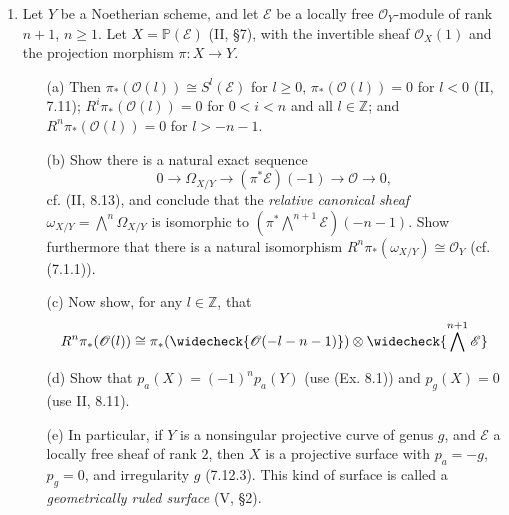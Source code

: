 \documentclass{article}
\newcommand{\fE}{\mathscr{E}}
\newcommand{\fO}{\mathscr{O}}
\newcommand{\PP}{\mathbb{P}}
\newcommand{\Z}{\mathbb{Z}}
\begin{document}
\begin{enumerate} [label=\textbf{\arabic*.}, leftmargin=0em]
\item Let $Y$ be a Noetherian scheme, and let $\mathscr{E}$ be a locally free $\fO_Y$-module of rank $n + 1$, $n \geq 1$. Let $X = \PP(\mathscr{E})$ (II, \S 7), with the invertible sheaf $\fO_X(1)$ and the projection morphism $\pi : X \to Y$.
\begin{itemize}
  \item[(a)] Then $\pi_*(\fO(l)) \cong S^l(\fE)$ for $l \geq 0$, $\pi_*(\fO(l)) = 0$ for $l < 0$ (II, 7.11); $R^i\pi_*(\fO(l)) = 0$ for $0 < i < n$ and all $l \in \Z$; and $R^n \pi_*(\fO(l)) = 0$ for $l > - n - 1$.
  \item[(b)] Show there is a natural exact sequence
  \begin{equation*}
    0 \to \Omega_{X / Y} \to (\pi^* \fE)(-1) \to \fO \to 0,
  \end{equation*}
  cf. (II, 8.13), and conclude that the \textit{relative canonical sheaf} $\omega_{X/Y} = \bigwedge^n \Omega_{X / Y}$ is isomorphic to $(\pi^* \bigwedge^{n + 1} \fE)(-n - 1)$. Show furthermore that there is a natural isomorphism $R^n \pi_*(\omega_{X / Y}) \cong \fO_Y$ (cf. (7.1.1)).
  \item[(c)] Now show, for any $l \in \Z$, that
  \begin{equation*}
    R^n \pi_*(\fO(l)) \cong \pi_*(\widecheck{\fO(-l - n - 1)}) \otimes \widecheck{\bigwedge^{n + 1} \fE}
  \end{equation*}
  \item[(d)] Show that $p_a(X) = (-1)^n p_a(Y)$ (use (Ex. 8.1)) and $p_g(X) = 0$ (use II, 8.11).
  \item[(e)] In particular, if $Y$ is a nonsingular projective curve of genus $g$, and $\fE$ a locally free sheaf of rank $2$, then $X$ is a projective surface with $p_a = -g$, $p_g = 0$, and irregularity $g$ (7.12.3). This kind of surface is called a \textit{geometrically ruled surface} (V, \S 2).
\end{itemize}

\end{enumerate}
\end{document}
